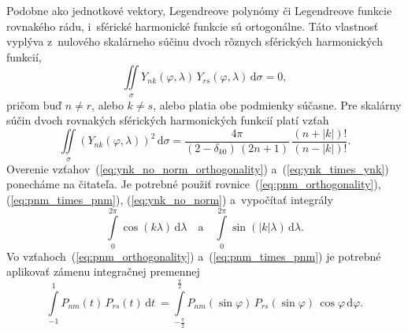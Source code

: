 \documentclass[a4paper, 12pt]{book}
\newcommand{\diff}{\mathrm d}
\begin{document}
Podobne ako jednotkové vektory, Legendreove polynómy či Legendreove funkcie 
rovnakého rádu, i~sférické harmonické funkcie sú ortogonálne.  Táto vlastnosť 
vyplýva z~nulového skalárneho súčinu dvoch rôznych sférických harmonických 
funkcií,
%
\begin{equation}
\label{eq:ynk_no_norm_orthogonality}
\iint\limits_{\sigma} Y_{nk}(\varphi, \lambda) \, Y_{rs}(\varphi, \lambda) \, 
\diff \sigma = 0{,}
\end{equation}
%
pričom buď $n \neq r$, alebo $k \neq s$, alebo platia obe podmienky súčasne.  
Pre skalárny súčin dvoch rovnakých sférických harmonických funkcií platí vzťah
%
\begin{equation}
\label{eq:ynk_times_ynk}
\iint\limits_{\sigma} \left( Y_{nk}(\varphi, \lambda) \right)^2 \, \diff \sigma 
=
%
\dfrac{4\pi}{(2 - \delta_{k0}) \, (2n + 1)} \, \dfrac{(n + |k|)!}{(n
- |k|)!}{.}
\end{equation}
%
Overenie vzťahov~(\ref{eq:ynk_no_norm_orthogonality})
a~(\ref{eq:ynk_times_ynk}) ponecháme na čitateľa.  Je potrebné použiť
rovnice~(\ref{eq:pnm_orthogonality}), (\ref{eq:pnm_times_pnm}),
(\ref{eq:ynk_no_norm}) a~vypočítať integrály
%
\begin{equation}
\label{eq:integrals_trig}
\int\limits_{0}^{2\pi} \cos(k \lambda) \, \diff\lambda \quad \text{a} \quad
\int\limits_{0}^{2\pi} \sin(|k| \lambda) \, \diff\lambda{.}
\end{equation}
%
Vo vzťahoch~(\ref{eq:pnm_orthogonality}) a~(\ref{eq:pnm_times_pnm}) je potrebné
aplikovať zámenu integračnej premennej
%
\begin{equation}
\label{eq:integrals_pnm_times_prs}
\int\limits_{-1}^{1} P_{nm}(t) \, P_{rs}(t) \, \diff
t~= \int\limits_{-\frac{\pi}{2}}^{\frac{\pi}{2}} P_{nm}(\sin\varphi) \,
P_{rs}(\sin\varphi) \, \cos\varphi \, \diff \varphi{.}
\end{equation}
\end{document}
